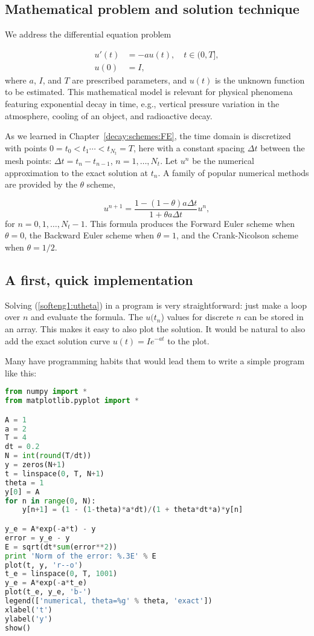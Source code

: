 \documentclass[graybox,sectrefs,envcountresetchap,open=right,final]{svmonodo}
\begin{document}
\subsection{Mathematical problem and solution technique}
\label{softeng1:basic:math}

We address the differential equation problem

\begin{align}
u'(t) &= -au(t), \quad t \in (0,T], \label{softeng1:ode}\\ 
u(0)  &= I,                         \label{softeng1:u0}
\end{align}
where $a$, $I$, and $T$ are prescribed parameters, and $u(t)$ is
the unknown function to be estimated. This mathematical model
is relevant for physical phenomena featuring exponential decay
in time, e.g., vertical pressure variation in the atmosphere,
cooling of an object, and radioactive decay.

As we learned in Chapter~\ref{decay:schemes:FE}, the
time domain is discretized with points $0 = t_0 < t_1 \cdots < t_{N_t}=T$,
here with a constant spacing $\Delta t$ between the
mesh points: $\Delta t = t_{n}-t_{n-1}$, $n=1,\ldots,N_t$. Let
$u^n$ be the numerical approximation to the exact solution at $t_n$.
A family of popular numerical methods are provided by the $\theta$ scheme,

\begin{equation}
u^{n+1} = \frac{1 - (1-\theta) a\Delta t}{1 + \theta a\Delta t}u^n,
\label{softeng1:utheta}
\end{equation}
for $n=0,1,\ldots,N_t-1$. This formula produces
the Forward Euler
scheme when $\theta=0$,
the Backward Euler
scheme when $\theta=1$,
and the Crank-Nicolson
scheme when $\theta=1/2$.


\subsection{A first, quick implementation}
\label{softeng1:basic:impl1}

Solving (\ref{softeng1:utheta}) in a program is very straightforward:
just make a loop over $n$ and evaluate the formula. The $u(t_n$)
values for discrete $n$ can be stored in an array. This makes it easy
to also plot the solution. It would be natural to also add
the exact
solution curve $u(t)=Ie^{-at}$ to the plot.

Many have programming habits that would lead them
to write a simple program like this:

\begin{lstlisting}[language=Python,style=blue1bar_bluegreen]
from numpy import *
from matplotlib.pyplot import *

A = 1
a = 2
T = 4
dt = 0.2
N = int(round(T/dt))
y = zeros(N+1)
t = linspace(0, T, N+1)
theta = 1
y[0] = A
for n in range(0, N):
    y[n+1] = (1 - (1-theta)*a*dt)/(1 + theta*dt*a)*y[n]

y_e = A*exp(-a*t) - y
error = y_e - y
E = sqrt(dt*sum(error**2))
print 'Norm of the error: %.3E' % E
plot(t, y, 'r--o')
t_e = linspace(0, T, 1001)
y_e = A*exp(-a*t_e)
plot(t_e, y_e, 'b-')
legend(['numerical, theta=%g' % theta, 'exact'])
xlabel('t')
ylabel('y')
show()
\end{lstlisting}
\end{document}
